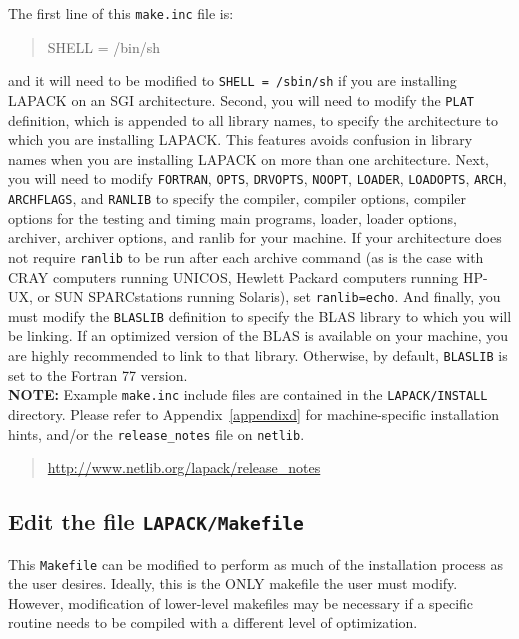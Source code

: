 \documentclass[11pt]{report}
\begin{document}
The first line of this \texttt{make.inc} file is:
\begin{quote}
SHELL = /bin/sh
\end{quote}
and it will need to be modified to \texttt{SHELL = /sbin/sh} if you are
installing LAPACK on an SGI architecture.
Second, you will
need to modify the \texttt{PLAT} definition, which is appended to all
library names, to specify the architecture to which you are installing
LAPACK.  This features avoids confusion in library names when you are
installing LAPACK on more than one architecture.  Next, you will need
to modify \texttt{FORTRAN}, \texttt{OPTS}, \texttt{DRVOPTS}, \texttt{NOOPT}, \texttt{LOADER},
\texttt{LOADOPTS}, \texttt{ARCH}, \texttt{ARCHFLAGS}, and \texttt{RANLIB} to specify
the compiler, compiler options, compiler options for the testing and
timing main programs, loader, loader options, archiver,
archiver options, and ranlib for your machine.  If your architecture
does not require \texttt{ranlib} to be run after each archive command (as
is the case with CRAY computers running UNICOS, Hewlett Packard
computers running HP-UX, or SUN SPARCstations running Solaris), set
\texttt{ranlib=echo}.  And finally, you must
modify the \texttt{BLASLIB} definition to specify the BLAS library to which
you will be linking.  If an optimized version of the BLAS is available
on your machine, you are highly recommended to link to that library.
Otherwise, by default, \texttt{BLASLIB} is set to the Fortran 77 version.  \\

\textbf{NOTE:}  Example \texttt{make.inc} include files are contained in the
\texttt{LAPACK/INSTALL} directory.  Please refer to
Appendix~\ref{appendixd} for machine-specific installation hints, and/or
the \texttt{release\_notes} file on \texttt{netlib}.
\begin{quote}
\url{http://www.netlib.org/lapack/release\_notes}
\end{quote}

\subsection{Edit the file \texttt{LAPACK/Makefile}}\label{toplevelmakefile}

This \texttt{Makefile} can be modified to perform as much of the
installation process as the user desires.  Ideally, this is the ONLY
makefile the user must modify.  However, modification of lower-level
makefiles may be necessary if a specific routine needs to be compiled
with a different level of optimization.  
\end{document}
